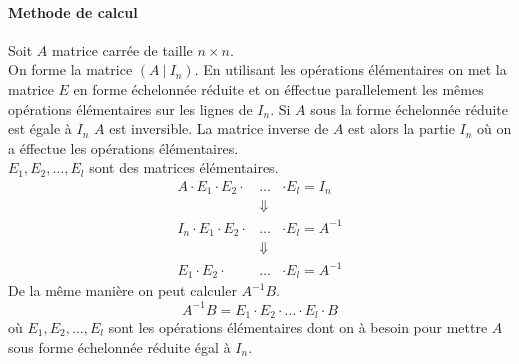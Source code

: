 \paragraph{Methode de calcul} Soit $A$ matrice carrée de taille $n\times n$. \\
On forme la matrice $(A ~ \vert ~ I_n)$. En utilisant les opérations élémentaires on met la matrice $E$ en forme échelonnée réduite et on éffectue parallelement les mêmes opérations élémentaires sur les lignes de $I_n$. Si $A$ sous la forme échelonnée réduite est égale à $I_n$ $A$ est inversible. La matrice inverse de $A$ est alors la partie $I_n$ où on a éffectue les opérations élémentaires. \\
$E_1, E_2, \ldots, E_l$ sont des matrices élémentaires.
\begin{eqnarray*}
  A \cdot E_1 \cdot E_2 \cdot &\ldots& \cdot E_l = I_n \\
  &\Downarrow& \\
  I_n \cdot E_1 \cdot E_2 \cdot &\ldots& \cdot E_l = A^{-1} \\
  &\Downarrow& \\
  E_1 \cdot E_2 \cdot &\ldots& \cdot E_l = A^{-1}
\end{eqnarray*}
De la même manière on peut calculer $A^{-1} B$.
$$A^{-1} B = E_1 \cdot E_2 \cdot \ldots \cdot E_l \cdot B$$
où $E_1, E_2, \ldots, E_l$ sont les opérations élémentaires dont on à besoin pour mettre $A$ sous forme échelonnée réduite égal à $I_n$.

